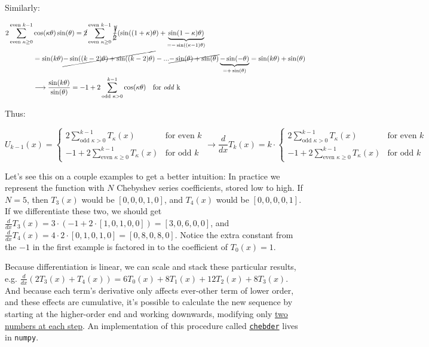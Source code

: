 \documentclass[10pt]{article}
\begin{document}
Similarly:

\begin{align*}
2\sum_{\text{even }\kappa \geq 0}^{\text{even }k-1} &\cos(\kappa\theta)\sin(\theta) = \cancel{2}\sum_{\text{even } \kappa \geq 0}^{\text{even }k-1} \cancel{\frac{1}{2}}(\sin((1+\kappa)\theta) + \underbrace{\sin(1-\kappa)\theta)}_{=-\sin((\kappa-1)\theta)}\\
&= \sin(k\theta) \cancel{-\sin((k-2)\theta) + \sin((k-2)\theta)} - ... \cancel{-\sin(\theta) + \sin(\theta)} \underbrace{-\sin(-\theta)}_{=+\sin(\theta)} = \sin(k\theta) + \sin(\theta)\\
&\longrightarrow \frac{\sin(k\theta)}{\sin(\theta)} = -1 + 2\sum_{\text{odd }\kappa>0}^{k-1} \cos(\kappa\theta) \quad \text{for \textit{odd} k}
\end{align*}

Thus:

$$U_{k-1}(x) = \begin{cases}
2\sum_{\text{odd } \kappa>0}^{k-1} T_\kappa(x) & \text{for even } k \\
-1 + 2\sum_{\text{even } \kappa \geq 0}^{k-1} T_\kappa(x) & \text{for odd } k
\end{cases}\longrightarrow \frac{d}{dx} T_k(x) = k \cdot \begin{cases}
2\sum_{\text{odd } \kappa>0}^{k-1} T_\kappa(x) & \text{for even } k \\
-1 + 2\sum_{\text{even } \kappa \geq 0}^{k-1} T_\kappa(x) & \text{for odd } k
\end{cases}$$

Let's see this on a couple examples to get a better intuition: In practice we represent the function with $N$ Chebyshev series coefficients, stored low to high. If $N=5$, then $T_3(x)$ would be $[0, 0, 0, 1, 0]$, and $T_4(x)$ would be $[0, 0, 0, 0, 1]$. If we differentiate these two, we should get $\frac{d}{dx}T_3(x) = 3 \cdot(-1 + 2 \cdot [1, 0, 1, 0, 0]) = [3, 0, 6, 0, 0]$, and $\frac{d}{dx}T_4(x) = 4 \cdot 2 \cdot [0, 1, 0, 1, 0] = [0, 8, 0, 8, 0]$. Notice the extra constant from the $-1$ in the first example is factored in to the coefficient of $T_0(x) = 1$.

Because differentiation is linear, we can scale and stack these particular results, e.g. $\frac{d}{dx}(2T_3(x) + T_4(x)) = 6T_0(x) + 8T_1(x) + 12T_2(x) + 8T_3(x)$. And because each term's derivative only affects ever-other term of lower order, and these effects are cumulative, it's possible to calculate the new sequence by starting at the higher-order end and working downwards, modifying only \href{https://scicomp.stackexchange.com/q/44939/48402}{two numbers at each step}\cite{dcoefs}. An implementation of this procedure called \href{https://github.com/numpy/numpy/blob/v2.2.0/numpy/polynomial/chebyshev.py#L874-L961}{\texttt{chebder}}\cite{chebder} lives in \texttt{numpy}.
\end{document}
